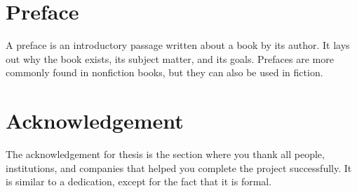 \documentclass[]{buthesis}
\begin{document}
%
\clearpage
\section*{Preface}
A preface is an introductory passage written about a book by its author. It lays out why the book exists, its subject matter, and its goals. Prefaces are more commonly found in nonfiction books, but they can also be used in fiction.


%
\clearpage
\section*{Acknowledgement}
The acknowledgement for thesis is the section where you thank all people, institutions, and companies that helped you complete the project successfully. It is similar to a dedication, except for the fact that it is formal.


%
\clearpage
\tableofcontents


%
\clearpage
\listoffigures


%
\clearpage
\listoftables


%
\clearpage

\end{document}
